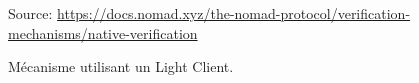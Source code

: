\begin{figure}[h!]
    \centering
{}
    {\scriptsize
            Source: \url{https://docs.nomad.xyz/the-nomad-protocol/verification-mechanisms/native-verification}}
    \caption{Mécanisme utilisant un Light Client.}
    \label{fig:LightClient}
\end{figure}

\pagebreak

